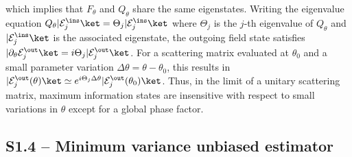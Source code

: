 \documentclass[aps,pra,twocolumn,amsmath,amssymb,superscriptaddress,10pt,nobibnotes]{revtex4-2}
\begin{document}
which implies that $F_\theta$ and $Q_\theta$ share the same eigenstates. Writing the eigenvalue equation $Q_\theta |\mathcal{E}^\ins_j\ket = \Theta_j |\mathcal{E}^\ins_j\ket$ where $\Theta_j$ is the $j$-th eigenvalue of $Q_\theta$ and $|\mathcal{E}^\ins_j\ket$ is the associated eigenstate, the outgoing field state satisfies $|\partial_\theta \mathcal{E}^\out_j \ket =i \Theta_j | \mathcal{E}^\out_j \ket $. For a scattering matrix evaluated at $\theta_0$ and a small parameter variation $\Delta \theta=\theta-\theta_0$, this results in $|\mathcal{E}^\out_j(\theta)\ket\simeq e^{i \Theta_j \Delta \theta} |\mathcal{E}^\out_j(\theta_0)\ket$. Thus, in the limit of a unitary scattering matrix, maximum information states are insensitive with respect to small variations in $\theta$ except for a global phase factor.

\subsection*{S1.4 -- Minimum variance unbiased estimator}
\end{document}
